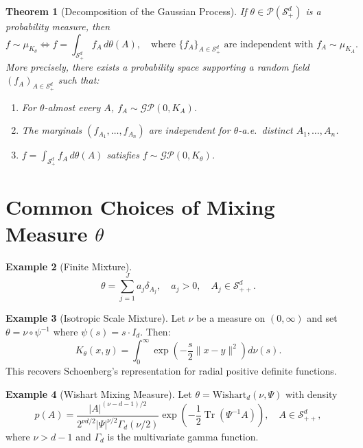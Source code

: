 \documentclass[11pt]{article}
\newtheorem{theorem}{Theorem}[section]
\theoremstyle{definition}
\newtheorem{example}[theorem]{Example}
\DeclareMathOperator{\Tr}{Tr}
\newcommand{\Splus}{\mathcal{S}_+^d}
\newcommand{\Splusplus}{\mathcal{S}_{++}^d}
\newcommand{\norm}[1]{\| #1 \|}
\begin{document}
\begin{theorem}[Decomposition of the Gaussian Process]
\label{thm:gp-decomposition}
If $\theta \in \mathcal{P}(\Splus)$ is a probability measure, then
\begin{equation}
    f \sim \mu_{K_\theta} \iff f = \int_{\Splus} f_A \, d\theta(A), \quad \text{where } \{f_A\}_{A \in \Splus} \text{ are independent with } f_A \sim \mu_{K_A}.
\end{equation}
More precisely, there exists a probability space supporting a random field $(f_A)_{A \in \Splus}$ such that:
\begin{enumerate}[label=(\roman*)]
    \item For $\theta$-almost every $A$, $f_A \sim \mathcal{GP}(0, K_A)$.
    \item The marginals $(f_{A_1}, \ldots, f_{A_n})$ are independent for $\theta$-a.e.\ distinct $A_1, \ldots, A_n$.
    \item $f = \int_{\Splus} f_A \, d\theta(A)$ satisfies $f \sim \mathcal{GP}(0, K_\theta)$.
\end{enumerate}
\end{theorem}

\section{Common Choices of Mixing Measure $\theta$}

\begin{example}[Finite Mixture]
\begin{equation}
    \theta = \sum_{j=1}^J a_j \delta_{A_j}, \quad a_j > 0, \quad A_j \in \Splusplus.
\end{equation}
\end{example}

\begin{example}[Isotropic Scale Mixture]
Let $\nu$ be a measure on $(0, \infty)$ and set $\theta = \nu \circ \psi^{-1}$ where $\psi(s) = s \cdot I_d$. Then:
\begin{equation}
    K_\theta(x,y) = \int_0^\infty \exp\left(-\frac{s}{2}\norm{x-y}^2\right) d\nu(s).
\end{equation}
This recovers Schoenberg's representation for radial positive definite functions.
\end{example}

\begin{example}[Wishart Mixing Measure]
Let $\theta = \text{Wishart}_d(\nu, \Psi)$ with density
\begin{equation}
    p(A) = \frac{|A|^{(\nu-d-1)/2}}{2^{\nu d/2} |\Psi|^{\nu/2} \Gamma_d(\nu/2)} \exp\left(-\frac{1}{2}\Tr(\Psi^{-1} A)\right), \quad A \in \Splusplus,
\end{equation}
where $\nu > d - 1$ and $\Gamma_d$ is the multivariate gamma function.
\end{example}
\end{document}
